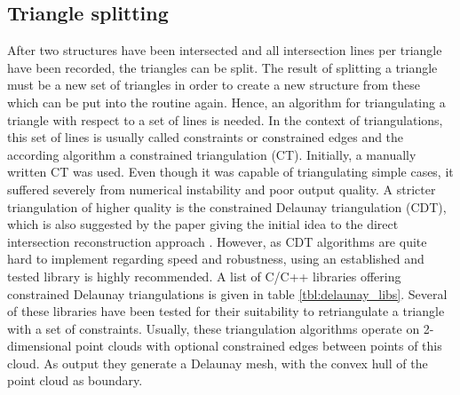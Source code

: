 \subsection{Triangle splitting}
\label{sec:triangle_splitting}

After two structures have been intersected and all intersection lines per triangle have been recorded, the triangles can be split.
The result of splitting a triangle must be a new set of triangles in order to create a new structure from these which can be put into the  routine again.
Hence, an algorithm for triangulating a triangle with respect to a set of lines is needed.
In the context of triangulations, this set of lines is usually called constraints or constrained edges and the according algorithm a constrained triangulation (CT).
Initially, a manually written CT was used.
Even though it was capable of triangulating simple cases, it suffered severely from numerical instability and poor output quality.
A stricter triangulation of higher quality is the constrained Delaunay triangulation (CDT), which is also suggested by the paper giving the initial idea to the direct intersection reconstruction approach \cite{mesh_intersection}.
However, as CDT algorithms are quite hard to implement regarding speed and robustness, using an established and tested library is highly recommended.
A list of C/C++ libraries offering constrained Delaunay triangulations is given in table \ref{tbl:delaunay_libs}.
Several of these libraries have been tested for their suitability to retriangulate a triangle with a set of constraints.
Usually, these triangulation algorithms operate on 2-dimensional point clouds with optional constrained edges between points of this cloud.
As output they generate a Delaunay mesh, with the convex hull of the point cloud as boundary.

